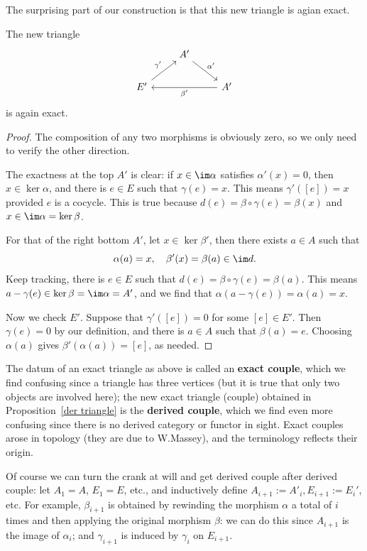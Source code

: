 The surprising part of our construction is that this new triangle is agian exact.
\begin{proposition}\label{der triangle}
The new triangle
\[\begin{tikzcd}
&A'\ar[rd,"\alpha'"]&\\
E'\ar[ru,"\gamma'"]&&A'\ar[ll,"\beta'"]
\end{tikzcd}\]
is again exact.
\end{proposition}
\begin{proof}
The composition of any two morphisms is obviously zero, so we only need to verify the other direction.\par
The exactness at the top $A'$ is clear: if $x\in\im\alpha$ satisfies $\alpha'(x)=0$, then $x\in\ker\alpha$, and there is $e\in E$ such that $\gamma(e)=x$. This means 
$\gamma'([e])=x$ provided $e$ is a cocycle. This is true because $d(e)=\beta\circ\gamma(e)=\beta(x)$ and $x\in\im\alpha=\ker\beta$.\par
For that of the right bottom $A'$, let $x\in\ker\beta'$, then there exists $a\in A$ such that 
\[\alpha(a)=x,\quad\beta'(x)=\beta(a)\in\im d.\]
Keep tracking, there is $e\in E$ such that $d(e)=\beta\circ\gamma(e)=\beta(a)$. This means $a-\gamma(e)\in\ker\beta=\im\alpha=A'$, and we find that 
$\alpha(a-\gamma(e))=\alpha(a)=x$.\par
Now we check $E'$. Suppose that $\gamma'([e])=0$ for some $[e]\in E'$. Then $\gamma(e)=0$ by our definition, and there is $a\in A$ such that $\beta(a)=e$. Choosing 
$\alpha(a)$ gives $\beta'(\alpha(a))=[e]$, as needed.
\end{proof}
The datum of an exact triangle as above is called an \textbf{exact couple}, which we find confusing since a triangle has three vertices (but it is true that only two 
objects are involved here); the new exact triangle (couple) obtained in Proposition~\ref{der triangle} is the \textbf{derived couple}, which we find even more confusing 
since there is no derived category or functor in sight. Exact couples arose in topology (they are due to W.Massey), and the terminology reflects their origin.\par
Of course we can turn the crank at will and get derived couple after derived couple: let $A_1=A$, $E_1=E$, etc., and inductively define $A_{i+1}:=A'_i, E_{i+1}:=E_i'$, 
etc. For example, $\beta_{i+1}$ is obtained by rewinding the morphism $\alpha$ a total of $i$ times and then applying the original morphism $\beta$: we can do this 
since $A_{i+1}$ is the image of $\alpha_i$; and $\gamma_{i+1}$ is induced by $\gamma_i$ on $E_{i+1}$.\par
